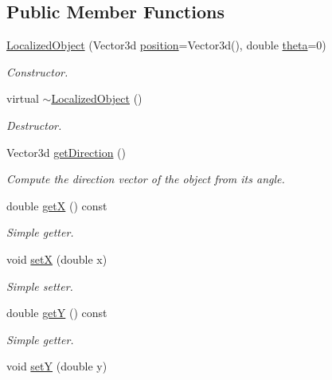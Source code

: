 \subsection*{Public Member Functions}
\begin{DoxyCompactItemize}
\item 
\hyperlink{classLocalizedObject_a85c2aba0c93b4d90b9e001409d6a5381}{Localized\+Object} (Vector3d \hyperlink{classLocalizedObject_a340834deefc9e5c39da1f26c4ebf4f8c}{position}=Vector3d(), double \hyperlink{classLocalizedObject_aa5f7b070b6dc97a64a90797a0bca56e2}{theta}=0)
\begin{DoxyCompactList}\small\item\em Constructor. \end{DoxyCompactList}\item 
virtual \hyperlink{classLocalizedObject_a1425438490ec7cd508721b9ccaef7a80}{$\sim$\+Localized\+Object} ()
\begin{DoxyCompactList}\small\item\em Destructor. \end{DoxyCompactList}\item 
Vector3d \hyperlink{classLocalizedObject_ab3a9262ca2086b812166a5b23df0a34c}{get\+Direction} ()
\begin{DoxyCompactList}\small\item\em Compute the direction vector of the object from its angle. \end{DoxyCompactList}\item 
double \hyperlink{classLocalizedObject_a5fec63cd061189992f011237a62c81b2}{getX} () const 
\begin{DoxyCompactList}\small\item\em Simple getter. \end{DoxyCompactList}\item 
void \hyperlink{classLocalizedObject_a53154ec51dcbf7d200f8f6f09c65f247}{setX} (double x)
\begin{DoxyCompactList}\small\item\em Simple setter. \end{DoxyCompactList}\item 
double \hyperlink{classLocalizedObject_a406d1b48a67b1d6bbfc98d6b57c7f24e}{getY} () const 
\begin{DoxyCompactList}\small\item\em Simple getter. \end{DoxyCompactList}\item 
void \hyperlink{classLocalizedObject_a6d9bf8b47e887c48d126fa367d1c084b}{setY} (double y)

\end{DoxyCompactItemize}
